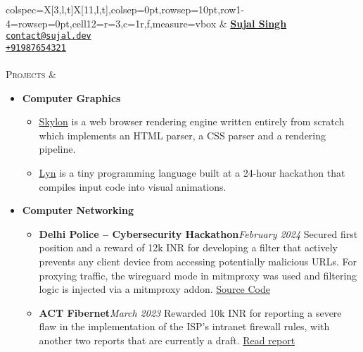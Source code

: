 \documentclass[11pt]{article}
\begin{document}
    \noindent%
    \begin{tblr}%
    {colspec={X[3,l,t]X[11,l,t]},colsep=0pt,rowsep=10pt,row{1-4}={rowsep=0pt},cell{1}{2}={r=3,c=1}{r,f},measure=vbox}%
        \href{https://github.com/sujaldev}{\faGithub}
        \hspace{5pt} \href{https://linkedin.com/in/sujal-singh}{\faLinkedin}
        \hspace{5pt} \href{https://youtube.com/@sujaldev}{\faYoutube}
        &
        \href{https://sujal.dev/}{\textbf{\Huge Sujal Singh}}
        \\
        \href{mailto:contact@sujal.dev}{\texttt{contact@sujal.dev}}
        \\
        \href{tel:+91987654321}{\texttt{+91987654321}}
        \\ \\
        \textsc{\Large Projects} &
        \vspace*{-1.5\topsep}
        \begin{itemize}[topsep=0pt,leftmargin=15pt]
            \item \textbf{Computer Graphics}
            \begin{itemize}
                \item \href{https://github.com/sujaldev/skylon}{\color{blue}Skylon} is a web browser rendering engine
                written entirely from scratch which implements an HTML parser, a CSS parser and a rendering pipeline.
                \item \href{https://github.com/sujaldev/lyn}{\color{blue}Lyn} is a tiny programming language built at a
                24-hour hackathon that compiles input code into visual animations.
            \end{itemize}

            \item \textbf{Computer Networking}
            \begin{itemize}
                \item \textbf{Delhi Police -- Cybersecurity Hackathon}\hfill\textit{February 2024}\newline
                Secured first position and a reward of 12k INR for developing a filter that actively prevents any client
                device from accessing potentially malicious URLs. For proxying traffic, the wireguard mode in mitmproxy
                was used and filtering logic is injected via a mitmproxy addon.
                \href{https://github.com/sujaldev/cerberus}{\color{blue}Source Code}
                \item \textbf{ACT Fibernet}\hfill\textit{March 2023}\newline
                Rewarded 10k INR for reporting a severe flaw in the implementation of the ISP's intranet firewall rules,
                with another two reports that are currently a draft.
                \href{https://pdf.sujal.dev/act/report.pdf}{\color{blue} Read report}
            \end{itemize}


\end{itemize}
\end{tblr}
\end{document}
